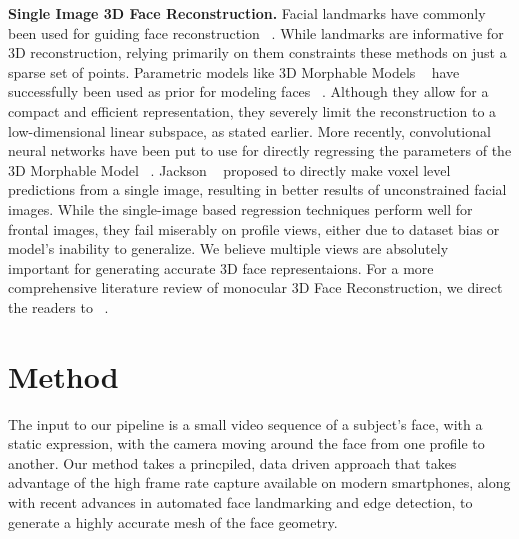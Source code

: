 \documentclass[10pt,twocolumn,letterpaper]{article}
\begin{document}
\noindent \textbf{Single Image 3D Face Reconstruction.} Facial landmarks have commonly been used for guiding face reconstruction ~\cite{zhu2015high, aldrian2010linear, kemelmacher20113d, dou2014robust}. While landmarks are informative for 3D reconstruction, relying primarily on them constraints these methods on just a sparse set of points. Parametric models like 3D Morphable Models ~\cite{blanz1999morphable} have successfully been used as prior for modeling faces ~\cite{blanz1999morphable, breuer2008automatic, zhu2015high, saito2017photorealistic, jiang20183d, richardson20163d, tuan2017regressing}. Although they allow for a compact and efficient representation, they severely limit the reconstruction to a low-dimensional linear subspace, as stated earlier. More recently, convolutional neural networks have been put to use for directly regressing the parameters of the 3D Morphable Model ~\cite{zhu2016face, jourabloo2016large, huber2016multiresolution}. Jackson \etal ~\cite{jackson2017large} proposed to directly make voxel level predictions from a single image, resulting in better results of unconstrained facial images. While the single-image based regression techniques perform well for frontal images, they fail miserably on profile views, either due to dataset bias or model's inability to generalize. We believe multiple views are absolutely important for generating accurate 3D face representaions.  For a more comprehensive literature review of monocular 3D Face Reconstruction, we direct the readers to ~\cite{zollhofer2018state}.




\section{Method}

The input to our pipeline is a small video sequence of a subject's face, with a static expression, with the camera moving around the face from one profile to another.
Our method takes a princpiled, data driven approach that takes advantage of the high frame rate capture available on modern smartphones, along with recent advances in automated face landmarking and edge detection, to generate a highly accurate mesh of the face geometry. 
\end{document}
